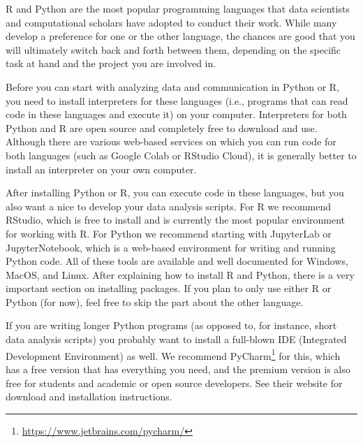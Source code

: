 R and Python are the most popular programming languages that data
scientists and computational scholars have adopted to conduct their
work. While many develop a preference
for  one or the other language, the chances are good that you
will ultimately switch back and forth between them, depending on
the specific task at hand and the project you are involved in.

Before you can start with analyzing data and communication in Python or R,
you need to install interpreters for these languages (i.e., programs that can read code in these languages and execute it) on your computer.
Interpreters for both Python and R are open source and completely free to download and use.
Although there are various web-based services on which you can run code for both languages
(such as Google Colab or RStudio Cloud),
it is generally better to install an interpreter on your own computer.

After installing Python or R, you can execute code in these languages, but you also want a nice
 to develop your data analysis scripts. 
For R we recommend RStudio, which is free to install and is currently the most popular environment for working with R.
For Python we recommend starting with JupyterLab or JupyterNotebook, which is a web-based environment for writing and running Python code.
All of these tools are available and well documented for Windows, MacOS, and Linux. 
After explaining how to install R and Python, there is a very important section on installing packages.
If you plan to only use either R or Python (for now), feel free to skip the part about the other language.

If you are writing longer Python programs (as opposed to, for instance, short data analysis scripts) you probably want to install a full-blown IDE (Integrated Development Environment) as well.
We recommend PyCharm\footnote{\url{https://www.jetbrains.com/pycharm/}} for this, which has a free version that has everything you need, and the premium version is also free for students and academic or open source developers.
See their website for download and installation instructions.


